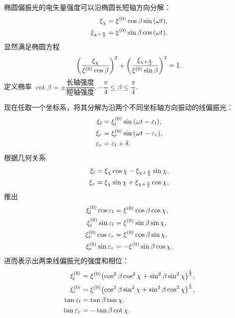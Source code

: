 \documentclass[../天体物理基础.tex]{subfiles}
\begin{document}
椭圆偏振光的电矢量强度可以沿椭圆长短轴方向分解：
\begin{align}
\xi_{\chi}&=\xi^{\mleft(0\mright)}\cos{\beta}\sin{\mleft(\omega t\mright)},\\
\xi_{\chi+\frac{\pi}{2}}&=\xi^{\mleft(0\mright)}\sin{\beta}\cos{\mleft(\omega t\mright)}.
\end{align}
显然满足椭圆方程
\begin{equation}
\mleft(\frac{\xi_{\chi}}{\xi^{\mleft(0\mright)}\cos{\beta}}\mright)^{2}+\mleft(\frac{\xi_{\chi+\frac{\pi}{2}}}{\xi^{\mleft(0\mright)}\sin{\beta}}\mright)^{2}=1.
\end{equation}
定义椭率 $\cot{\beta}=\pm\dfrac{\text{长轴强度}}{\text{短轴强度}},-\dfrac{\pi}{4}\le\beta\le\dfrac{\pi}{4}$.

现在任取一个坐标系，将其分解为沿两个不同坐标轴方向振动的线偏振光：
\begin{align}
\xi_{l}&=\xi_{l}^{\mleft(0\mright)}\sin{\mleft(\omega t-\varepsilon_{l}\mright)},\\
\xi_{r}&=\xi_{r}^{\mleft(0\mright)}\sin{\mleft(\omega t-\varepsilon_{r}\mright)},\\
\varepsilon_{r}&=\varepsilon_{l}+\delta.
\end{align}
根据几何关系
\begin{align}
\xi_{l}&=\xi_{\chi}\cos{\chi}-\xi_{\chi+\frac{\pi}{2}}\sin{\chi},\notag\\
\xi_{r}&=\xi_{\chi}\sin{\chi}+\xi_{\chi+\frac{\pi}{2}}\cos{\chi},\notag
\end{align}
推出
\begin{align}
\xi_{l}^{\mleft(0\mright)}\cos{\varepsilon_{l}}&=\xi^{\mleft(0\mright)}\cos{\beta}\cos{\chi},\\
\xi_{l}^{\mleft(0\mright)}\sin{\varepsilon_{l}}&=\xi^{\mleft(0\mright)}\sin{\beta}\sin{\chi},\\
\xi_{r}^{\mleft(0\mright)}\cos{\varepsilon_{r}}&=\xi^{\mleft(0\mright)}\cos{\beta}\sin{\chi},\\
\xi_{r}^{\mleft(0\mright)}\sin{\varepsilon_{r}}&=-\xi^{\mleft(0\mright)}\sin{\beta}\cos{\chi}.
\end{align}
进而表示出两束线偏振光的强度和相位：
\begin{align}
\xi_{l}^{\mleft(0\mright)}&=\xi^{\mleft(0\mright)}\mleft(\cos^{2}{\beta}\cos^{2}{\chi}+\sin^{2}{\beta}\sin^{2}{\chi}\mright)^{\frac{1}{2}},\\
\xi_{r}^{\mleft(0\mright)}&=\xi^{\mleft(0\mright)}\mleft(\cos^{2}{\beta}\sin^{2}{\chi}+\sin^{2}{\beta}\cos^{2}{\chi}\mright)^{\frac{1}{2}},\\
\tan{\varepsilon_{l}}&=\tan{\beta}\tan{\chi},\\
\tan{\varepsilon_{r}}&=-\tan{\beta}\cot{\chi}.
\end{align}
\end{document}
